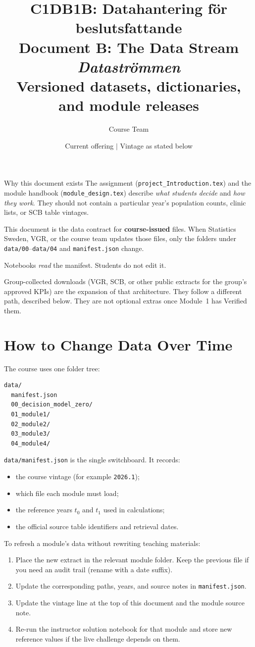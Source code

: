 \documentclass[11pt,a4paper]{article}
\title{
    {\Large C1DB1B: Datahantering f\"or beslutsfattande}\\[0.5em]
    {\LARGE Document B: The Data Stream}\\[0.3em]
    {\large \textit{Datastr\"ommen}}\\[0.5em]
    {\large Versioned datasets, dictionaries, and module releases}
}
\author{Course Team}
\date{Current offering \quad $|$ \quad Vintage as stated below}
\begin{document}
\maketitle

\begin{casebox}{Why this document exists}
The assignment (\texttt{project\_Introduction.tex}) and the module handbook
(\texttt{module\_design.tex}) describe \emph{what students decide}
and \emph{how they work}. They should not contain a particular year's
population counts, clinic lists, or SCB table vintages.

This document is the data contract for \textbf{course-issued} files.
When Statistics Sweden, VGR, or the course team updates those files,
only the folders under \texttt{data/00}--\texttt{data/04} and
\texttt{manifest.json} change.

Notebooks \emph{read} the manifest. Students do not edit it.

Group-collected downloads (VGR, SCB, or other public extracts
for the group's approved KPIs) are the expansion of that
architecture. They follow a different path, described below.
They are not optional extras once Module~1 has Verified them.
\end{casebox}

\section{How to Change Data Over Time}

The course uses one folder tree:

\begin{verbatim}
data/
  manifest.json
  00_decision_model_zero/
  01_module1/
  02_module2/
  03_module3/
  04_module4/
\end{verbatim}

\texttt{data/manifest.json} is the single switchboard. It records:
\begin{itemize}
    \item the course vintage (for example \texttt{2026.1});
    \item which file each module must load;
    \item the reference years $t_0$ and $t_1$ used in calculations;
    \item the official source table identifiers and retrieval dates.
\end{itemize}

To refresh a module's data without rewriting teaching materials:
\begin{enumerate}
    \item Place the new extract in the relevant module folder. Keep the
    previous file if you need an audit trail (rename with a date suffix).
    \item Update the corresponding paths, years, and source notes in
    \texttt{manifest.json}.
    \item Update the vintage line at the top of this document and the
    module source note.
    \item Re-run the instructor solution notebook for that module and
    store new reference values if the live challenge depends on them.
\end{enumerate}
\end{document}
